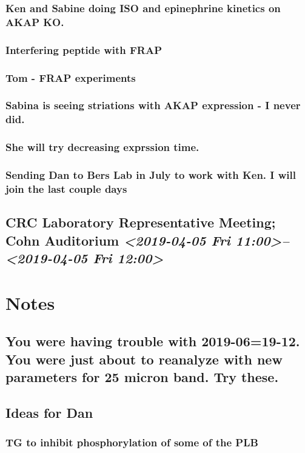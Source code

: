 \documentclass[11pt]{article}
\begin{document}
\subsubsection{Ken and Sabine doing ISO and epinephrine kinetics on AKAP KO.}
\label{sec:org5d7226f}
\subsubsection{Interfering peptide with FRAP}
\label{sec:org9d81661}
\subsubsection{Tom - FRAP experiments}
\label{sec:orgf0ce34f}
\subsubsection{Sabina is seeing striations with AKAP expression - I never did.}
\label{sec:orgb7aac4a}
\subsubsection{She will try decreasing exprssion time.}
\label{sec:org20aad9b}
\subsubsection{Sending Dan to Bers Lab in July to work with Ken.  I will join the last couple days}
\label{sec:orgb4634cd}
\subsection{CRC Laboratory Representative Meeting; Cohn Auditorium \textit{<2019-04-05 Fri 11:00>--<2019-04-05 Fri 12:00>}}
\label{sec:org993d536}
\section{\textbf{Notes}}
\label{sec:org058c930}
\subsection{You were having trouble with 2019-06=19-12.  You were just about to reanalyze with new parameters for 25 micron band.  Try these.}
\label{sec:orgb46c55f}
\subsection{Ideas for Dan}
\label{sec:orgd931f96}
\subsubsection{TG to inhibit phosphorylation of some of the PLB}
\label{sec:orgc4d4934}
\end{document}
